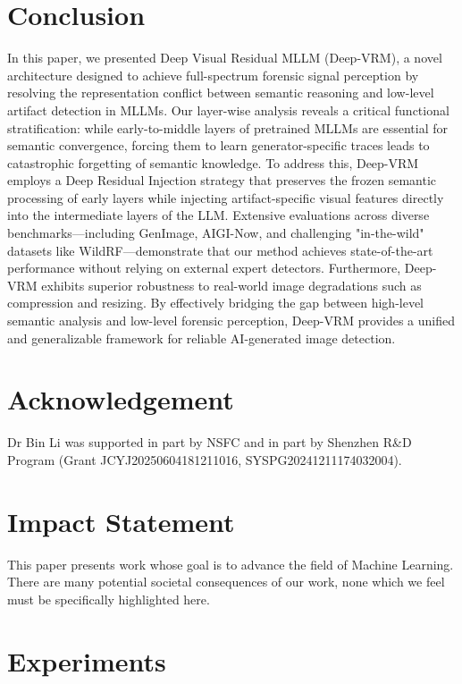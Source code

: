 \documentclass{article}
\theoremstyle{plain}
\theoremstyle{definition}
\theoremstyle{remark}
\begin{document}
\section{Conclusion}
In this paper, we presented Deep Visual Residual MLLM (Deep-VRM), a novel architecture designed to achieve full-spectrum forensic signal perception by resolving the representation conflict between semantic reasoning and low-level artifact detection in MLLMs. Our layer-wise analysis reveals a critical functional stratification: while early-to-middle layers of pretrained MLLMs are essential for semantic convergence, forcing them to learn generator-specific traces leads to catastrophic forgetting of semantic knowledge.
To address this, Deep-VRM employs a Deep Residual Injection strategy that preserves the frozen semantic processing of early layers while injecting artifact-specific visual features directly into the intermediate layers of the LLM. Extensive evaluations across diverse benchmarks—including GenImage, AIGI-Now, and challenging "in-the-wild" datasets like WildRF—demonstrate that our method achieves state-of-the-art performance without relying on external expert detectors. Furthermore, Deep-VRM exhibits superior robustness to real-world image degradations such as compression and resizing. By effectively bridging the gap between high-level semantic analysis and low-level forensic perception, Deep-VRM provides a unified and generalizable framework for reliable AI-generated image detection.



\newpage
\clearpage
\section*{Acknowledgement}
Dr Bin Li was supported in part by NSFC and in part by Shenzhen R\&D Program (Grant JCYJ20250604181211016, SYSPG20241211174032004).

\section*{Impact Statement}
This paper presents work whose goal is to advance the field of Machine
Learning. There are many potential societal consequences of our work, none
which we feel must be specifically highlighted here.




\clearpage


\appendix

\section{Experiments}
\end{document}
